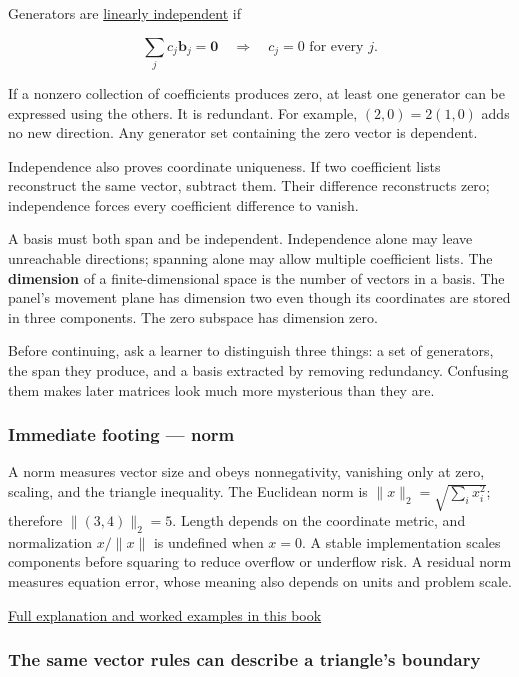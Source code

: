 Generators are \hyperref[01-foundations-i-ch019]{linearly independent} if

\[
\sum_jc_j\mathbf b_j=\mathbf0
\quad\Longrightarrow\quad c_j=0\text{ for every }j.
\]

If a nonzero collection of coefficients produces zero, at least one generator can be expressed using the others. It is redundant. For example, \((2,0)=2(1,0)\) adds no new direction. Any generator set containing the zero vector is dependent.

Independence also proves coordinate uniqueness. If two coefficient lists reconstruct the same vector, subtract them. Their difference reconstructs zero; independence forces every coefficient difference to vanish.

A basis must both span and be independent. Independence alone may leave unreachable directions; spanning alone may allow multiple coefficient lists. The \textbf{dimension} of a finite-dimensional space is the number of vectors in a basis. The panel's movement plane has dimension two even though its coordinates are stored in three components. The zero subspace has dimension zero.

Before continuing, ask a learner to distinguish three things: a set of generators, the span they produce, and a basis extracted by removing redundancy. Confusing them makes later matrices look much more mysterious than they are.

\subsubsection{Immediate footing --- norm}\label{immediate-footing-norm}

A norm measures vector size and obeys nonnegativity, vanishing only at zero, scaling, and the triangle inequality. The Euclidean norm is \(\|x\|_2=\sqrt{\sum_i x_i^2}\); therefore \(\|(3,4)\|_2=5\). Length depends on the coordinate metric, and normalization \(x/\|x\|\) is undefined when \(x=0\). A stable implementation scales components before squaring to reduce overflow or underflow risk. A residual norm measures equation error, whose meaning also depends on units and problem scale.

\hyperref[01-foundations-i-ch017]{Full explanation and worked examples in this book}

\subsubsection{The same vector rules can describe a triangle's boundary}\label{the-same-vector-rules-can-describe-a-triangles-boundary}

